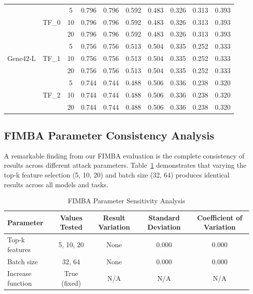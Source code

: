\documentclass{article} %
\begin{document}
\begin{table}[h]
{\begin{tabular}{llcccccccc}
\midrule
\multirow{9}{*}{Gene42-L} & \multirow{3}{*}{TF\_0} & 5 & 0.796 & 0.796 & 0.592 & 0.483 & 0.326 & 0.313 & 0.393 \\
& & 10 & 0.796 & 0.796 & 0.592 & 0.483 & 0.326 & 0.313 & 0.393 \\
& & 20 & 0.796 & 0.796 & 0.592 & 0.483 & 0.326 & 0.313 & 0.393 \\
\cmidrule{2-10}
& \multirow{3}{*}{TF\_1} & 5 & 0.756 & 0.756 & 0.513 & 0.504 & 0.335 & 0.252 & 0.333 \\
& & 10 & 0.756 & 0.756 & 0.513 & 0.504 & 0.335 & 0.252 & 0.333 \\
& & 20 & 0.756 & 0.756 & 0.513 & 0.504 & 0.335 & 0.252 & 0.333 \\
\cmidrule{2-10}
& \multirow{3}{*}{TF\_2} & 5 & 0.744 & 0.744 & 0.488 & 0.506 & 0.336 & 0.238 & 0.320 \\
& & 10 & 0.744 & 0.744 & 0.488 & 0.506 & 0.336 & 0.238 & 0.320 \\
& & 20 & 0.744 & 0.744 & 0.488 & 0.506 & 0.336 & 0.238 & 0.320 \\
\bottomrule
\end{tabular}
}
\end{table}

\subsection{FIMBA Parameter Consistency Analysis}

A remarkable finding from our FIMBA evaluation is the complete consistency of results across different attack parameters. Table~\ref{tab:fimba_parameter_analysis} demonstrates that varying the top-k feature selection (5, 10, 20) and batch size (32, 64) produces identical results across all models and tasks.

\begin{table}[h]
\centering
\caption{FIMBA Parameter Sensitivity Analysis}
\label{tab:fimba_parameter_analysis}
\begin{tabular}{lcccc}
\toprule
\textbf{Parameter} & \textbf{Values Tested} & \textbf{Result Variation} & \textbf{Standard Deviation} & \textbf{Coefficient of Variation} \\
\midrule
Top-k features & 5, 10, 20 & None & 0.000 & 0.000 \\
Batch size & 32, 64 & None & 0.000 & 0.000 \\
Increase function & True (fixed) & N/A & N/A & N/A \\
\bottomrule
\end{tabular}
\end{table}
\end{document}
